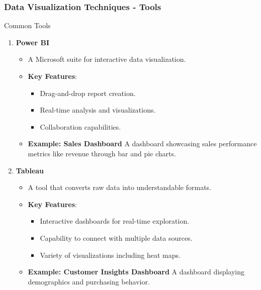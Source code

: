 \documentclass[aspectratio=169]{beamer}
\begin{document}
\begin{frame}[fragile]
    \frametitle{Data Visualization Techniques - Tools}
    \begin{block}{Common Tools}
        \begin{enumerate}
            \item \textbf{Power BI}
                \begin{itemize}
                    \item A Microsoft suite for interactive data visualization.
                    \item \textbf{Key Features}:
                        \begin{itemize}
                            \item Drag-and-drop report creation.
                            \item Real-time analysis and visualizations.
                            \item Collaboration capabilities.
                        \end{itemize}
                    \item \textbf{Example: Sales Dashboard}
                    A dashboard showcasing sales performance metrics like revenue through bar and pie charts.
                \end{itemize}
                
            \item \textbf{Tableau}
                \begin{itemize}
                    \item A tool that converts raw data into understandable formats.
                    \item \textbf{Key Features}:
                        \begin{itemize}
                            \item Interactive dashboards for real-time exploration.
                            \item Capability to connect with multiple data sources.
                            \item Variety of visualizations including heat maps.
                        \end{itemize}
                    \item \textbf{Example: Customer Insights Dashboard}
                    A dashboard displaying demographics and purchasing behavior.
                \end{itemize}
        \end{enumerate}
    \end{block}
\end{frame}
\end{document}
